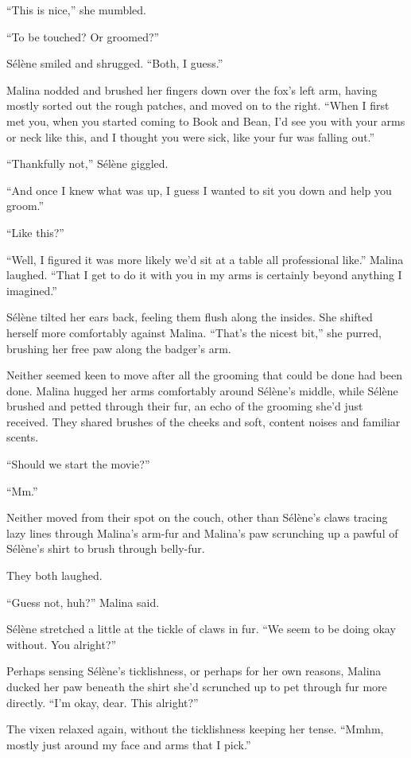 ``This is nice,'' she mumbled.

``To be touched? Or groomed?''

Sélène smiled and shrugged. ``Both, I guess.''

Malina nodded and brushed her fingers down over the fox's left arm, having mostly sorted out the rough patches, and moved on to the right. ``When I first met you, when you started coming to Book and Bean, I'd see you with your arms or neck like this, and I thought you were sick, like your fur was falling out.''

``Thankfully not,'' Sélène giggled.

``And once I knew what was up, I guess I wanted to sit you down and help you groom.''

``Like this?''

``Well, I figured it was more likely we'd sit at a table all professional like.'' Malina laughed. ``That I get to do it with you in my arms is certainly beyond anything I imagined.''

Sélène tilted her ears back, feeling them flush along the insides. She shifted herself more comfortably against Malina. ``That's the nicest bit,'' she purred, brushing her free paw along the badger's arm.

Neither seemed keen to move after all the grooming that could be done had been done. Malina hugged her arms comfortably around Sélène's middle, while Sélène brushed and petted through their fur, an echo of the grooming she'd just received. They shared brushes of the cheeks and soft, content noises and familiar scents.

``Should we start the movie?''

``Mm.''

Neither moved from their spot on the couch, other than Sélène's claws tracing lazy lines through Malina's arm-fur and Malina's paw scrunching up a pawful of Sélène's shirt to brush through belly-fur.

They both laughed.

``Guess not, huh?'' Malina said.

Sélène stretched a little at the tickle of claws in fur. ``We seem to be doing okay without. You alright?''

Perhaps sensing Sélène's ticklishness, or perhaps for her own reasons, Malina ducked her paw beneath the shirt she'd scrunched up to pet through fur more directly. ``I'm okay, dear. This alright?''

The vixen relaxed again, without the ticklishness keeping her tense. ``Mmhm, mostly just around my face and arms that I pick.''

